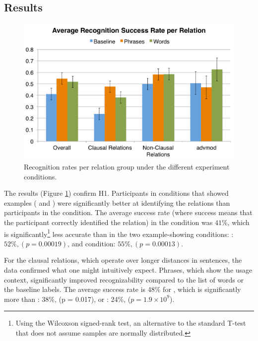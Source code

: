 \subsection{Results}
\begin{figure}
\centering
\includegraphics[width=\columnwidth]{fig/results}
\caption{\label{fig:results}Recognition rates per relation group under the different experiment conditions.}
\end{figure}
The results (Figure \ref{fig:results}) confirm H1. Participants in conditions that showed examples ( and ) were significantly better at identifying the relations than participants in the  condition.  The average success rate (where success means that the participant correctly identified the relation) in the  condition was $41\%$, which is significantly\footnote{Using the Wilcoxson signed-rank test, an alternative to the standard T-test that does not assume samples are normally distributed.} less accurate than in the two example-showing conditions: : $52\%, (p = 0.00019)$, and  condition: $55\%, (p = 0.00013)$.

For the clausal relations, which operate over longer distances in sentences, the data confirmed what one might intuitively expect. Phrases, which show the usage context, significantly improved recognizability compared to the list of words or the baseline labels. The average success rate is 48\% for , which is significantly more than : 38\%, (p = 0.017), or : 24\%, ($p= 1.9 \times 10^9$).


